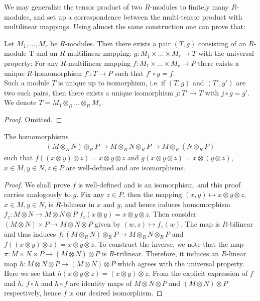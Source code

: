 \noindent
We may generalize the tensor product of two $R$-modules to finitely many 
$R$-modules, and set up a
correspondence between the multi-tensor product with multilinear mappings. 
Using almost the same construction
one can prove that:

\begin{lemma}
\label{lemma-multilinear}
Let $M_1,...,M_r$ be $R$-modules.
Then there exists a pair $(T,g)$ consisting 
of an $R$-module T and an
$R$-multilinear mapping:
$g:M_1\times ...\times M_r\rightarrow T$ with the universal 
property: For any $R$-multilinear
mapping $f:M_1\times ... \times M_r\rightarrow P$ there exists a unique 
$R$-homomorphism $f':T\rightarrow P$ such that
$f'\circ g=f$. \\
Such a module $T$ is unique up to isomorphism, i.e. if $(T,g)$ and $(T',g')$ 
are two such pairs, then there
exists a unique isomorphism $j:T'\rightarrow T$ with $j\circ g=g'$. We denote 
$T=M_1\otimes_R ... \otimes_R M_r$.
\end{lemma}

\begin{proof}
Omitted.
\end{proof}

\begin{lemma}
\label{lemma-transitive}
The homomorphisms
\begin{align}
(M\otimes_R N)\otimes_R P\rightarrow
M\otimes_R N\otimes_R P\rightarrow
M\otimes_R (N\otimes_R P)
\end{align}
such that
$f((x\otimes y)\otimes z) = x\otimes y\otimes z$
and $g(x\otimes y\otimes z) = x\otimes (y\otimes z)$,
$x\in M, y\in N, z\in P$ are well-defined and are isomorphisms.
\end{lemma}

\begin{proof}
We shall prove $f$ is well-defined and is an isomorphism, and this proof 
carries analogously to $g$. Fix any
$z\in P$, then the mapping $(x,y)\mapsto x\otimes y\otimes z$,
$x\in M,y\in N$, is $R$-bilinear in $x$ and $y$,
and hence induces homomorphism $f_z:M\otimes N\rightarrow M\otimes N\otimes P$ 
$f_z(x\otimes y)=x\otimes y\otimes z$.
Then consider $(M\otimes N)\times P\rightarrow M\otimes N\otimes P$ given by 
$(w,z)\mapsto f_z(w)$. The map is
$R$-bilinear and thus induces
$f:(M\otimes_R N)\otimes_R P\rightarrow M\otimes_R N\otimes_R P$
and $f((x\otimes y)\otimes z)=x\otimes y\otimes z$.
To construct the inverse, we note that the map
$\pi:M\times N\times P\rightarrow (M\otimes N)\otimes P$ is
$R$-trilinear.
Therefore, it induces an $R$-linear map
$h:M\otimes N\otimes P\rightarrow (M\otimes N)\otimes P$ which
agrees with the universal property. Here we see that
$h(x\otimes y\otimes z)=(x\otimes y)\otimes z$.
From the explicit expression of $f$ and $h$, $f\circ h$ and $h\circ f$ are 
identity maps of $M\otimes N\otimes
P$ and $(M\otimes N)\otimes P$ respectively, hence $f$ is our desired 
isomorphism.
\end{proof}

